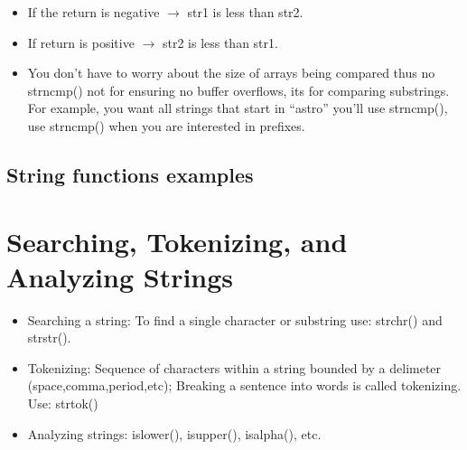 \begin{itemize}
\begin{itemize}
            \item If the return is negative $\rightarrow$ str1 is less than str2. 
            \item If return is positive $\rightarrow$ str2 is less than str1.
            \item You don't have to worry about the size of arrays being compared thus no strncmp() not for ensuring no buffer overflows, its for comparing substrings. For example, you want all strings that start in ``astro'' you'll use strncmp(), use strncmp() when you are interested in prefixes.
        \end{itemize}
\end{itemize}
\subsection{String functions examples}


\section{Searching, Tokenizing, and Analyzing Strings}
\begin{itemize}
    \item Searching a string: To find a single character or substring use: strchr() and strstr().
    \item Tokenizing: Sequence of characters within a string bounded by a delimeter (space,comma,period,etc); Breaking a sentence into words is called tokenizing. Use: strtok() 
    \item Analyzing strings: islower(), isupper(), isalpha(), etc. 
\end{itemize}

